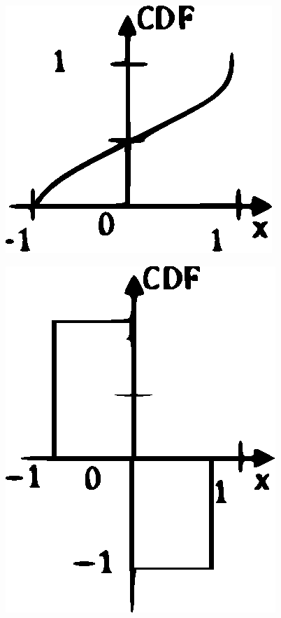 \begin{enumerate}[label=\thesection.\arabic*.,ref=\thesection.\theenumi]
\begin{figure}[!h]
\caption{}
\label{fig:4}
\end{figure}
\begin{figure}[!h]
\includegraphics[width=\columnwidth]{./figs/figure5.eps}
\caption{}
\label{fig:5}
\end{figure}

\begin{figure}[!h]
\includegraphics[width=\columnwidth]{./figs/figure6.eps}
\caption{}
\label{fig:6}
\end{figure}


\end{enumerate}
